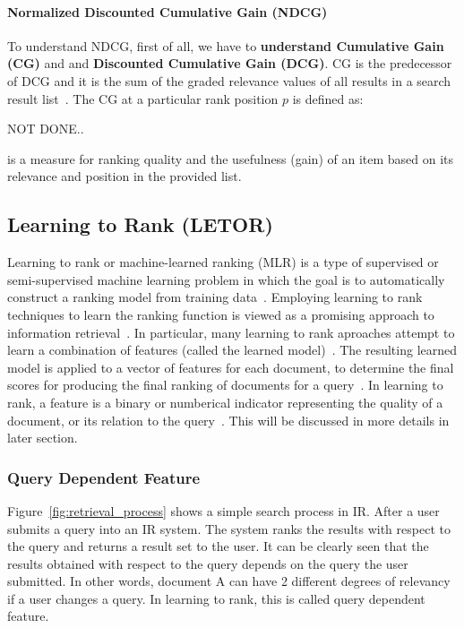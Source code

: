 \paragraph{Normalized Discounted Cumulative Gain (NDCG)}
To understand NDCG, first of all, we have to \textbf{understand Cumulative Gain (CG)} and and \textbf{Discounted Cumulative Gain (DCG)}. 
CG is the predecessor of DCG and it is the sum of the graded relevance values of all results in a search result list~\cite{ndcg}. The CG at a particular 
rank position $p$ is defined as:

NOT DONE..

is a measure for ranking quality and the usefulness (gain) of an item based on its relevance and position in the provided list.

\subsection{Learning to Rank (LETOR)}\label{sec:letor}
Learning to rank or machine-learned ranking (MLR) is a type of supervised or semi-supervised machine learning problem in which the goal is 
to automatically construct a ranking model from training data~\cite{letor}.
Employing learning to rank techniques to learn the ranking function is viewed as
a promising approach to information retrieval~\cite{letor}. In particular, many learning to rank aproaches attempt to learn a combination of features
(called the learned model)~\cite[P. 3]{learningmodel}. The resulting learned model is applied to a vector of features for each document, to determine the final scores for 
producing the final ranking of documents for a query~\cite[P. 3]{learningmodel}. In learning to rank, a feature is a binary or numberical indicator 
representing the quality of a document, or its relation to the query~\cite[P. 4]{learningmodel}. This will be discussed in more details in later section.

\subsubsection*{Query Dependent Feature}\label{section:querydependent}
Figure~\ref{fig:retrieval_process} shows a simple search process in IR. After a user submits a query into an IR system. The system ranks the results 
with respect to the query and returns a result set to the user. It can be clearly seen that the results obtained with respect to the query depends on the 
query the user submitted. In other words, document A can have 2 different degrees of relevancy if a user changes a query.
In learning to rank, this is called query dependent feature.

